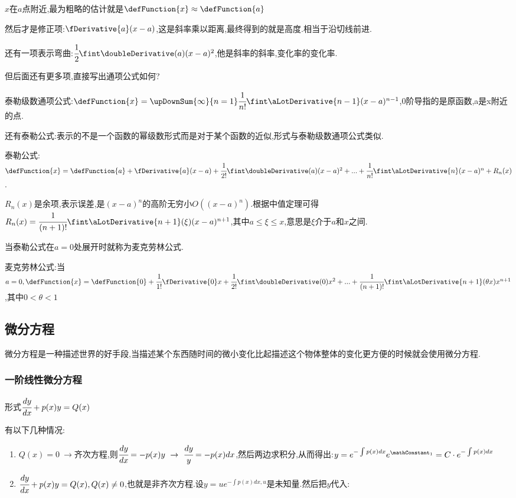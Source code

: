 {{{$x$在$a$点附近,最为粗略的估计就是$\defFunction{x} \approx \defFunction{a}$

然后才是修正项:$\fDerivative{a}(x - a)$,这是斜率乘以距离,最终得到的就是高度.相当于沿切线前进.

还有一项表示弯曲:$\cfrac{1}{2}\fint\doubleDerivative(a)(x - a)^2$,他是斜率的斜率,变化率的变化率.

但后面还有更多项,直接写出通项公式如何?

泰勒级数通项公式:$\defFunction{x} = \upDownSum{\infty}{n = 1}\cfrac{1}{n!}\fint\aLotDerivative{n - 1}(x - a)^{n - 1}$,0阶导指的是原函数,a是x附近的点.

还有泰勒公式:表示的不是一个函数的幂级数形式而是对于某个函数的近似,形式与泰勒级数通项公式类似.

泰勒公式:$\defFunction{x} = \defFunction{a} + \fDerivative{a}(x - a) + \cfrac{1}{2!}\fint\doubleDerivative(a)(x - a)^2 + ... + \cfrac{1}{n!}\fint\aLotDerivative{n}(x - a)^n + R_n(x)$.

$R_n(x)$是余项,表示误差,是$(x - a)^n$的高阶无穷小$O((x - a)^n)$.根据中值定理可得$R_n(x) = \cfrac{1}{(n + 1)!}\fint\aLotDerivative{n + 1}(\xi)(x - a)^{n+1}$,其中$a \leq \xi \leq x$,意思是$\xi$介于$a$和$x$之间.

当泰勒公式在$a = 0$处展开时就称为麦克劳林公式.

麦克劳林公式:当$a = 0, \defFunction{x} = \defFunction{0} + \cfrac{1}{1!}\fDerivative{0}x + \cfrac{1}{2!}\fint\doubleDerivative(0)x^2 + ... + \cfrac{1}{(n + 1)!}\fint\aLotDerivative{n + 1}(\theta x)x^{n+1}$,其中$0 < \theta < 1$

}%

}%

\subsection{微分方程}{
微分方程是一种描述世界的好手段,当描述某个东西随时间的微小变化比起描述这个物体整体的变化更方便的时候就会使用微分方程.

\subsubsection{一阶线性微分方程}{
  形式$\cfrac{dy}{dx} + p(x)y = Q(x)$

  有以下几种情况:
  \begin{enumerate}
    \item $Q(x) = 0\ \to$齐次方程,则$\cfrac{dy}{dx} = -p(x)y\ \to \ \cfrac{dy}{y} = -p(x)dx$,然后两边求积分,从而得出:$y = e^{-\int p(x)dx}e^{\mathConstant_1} = C \cdot e^{-\int p(x)dx}$
    \item {
          $\cfrac{dy}{dx} + p(x)y = Q(x), Q(x) \neq 0$,也就是非齐次方程.设$y = ue^{-\int p(x)dx, u}$是未知量.然后把$y$代入:

}
\end{enumerate}}}}
